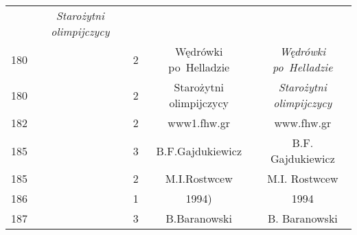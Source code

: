 \documentclass[a4paper,11pt]{article}
\begin{document}
\begin{center}
\begin{tabular}{|c|c|c|c|c|}
    & \textit{Starożytni olimpijczycy} \\
    180 & & \hphantom{0}2 & Wędrówki po~Helladzie
    & \textit{Wędrówki po~Helladzie} \\
    180 & & \hphantom{0}2 & Starożytni olimpijczycy
    & \textit{Starożytni olimpijczycy} \\
    182 & & \hphantom{0}2 & www1.fhw.gr & www.fhw.gr \\
    185 & & \hphantom{0}3 & B.F.Gajdukiewicz & B.F. Gajdukiewicz \\
    185 & & \hphantom{0}2 & M.I.Rostwcew & M.I. Rostwcew \\
    186 & & \hphantom{0}1 & 1994) & 1994 \\
    187 & & \hphantom{0}3 & B.Baranowski & B. Baranowski \\
    \hline
  \end{tabular}





  \newpage


\end{center}
\end{document}
